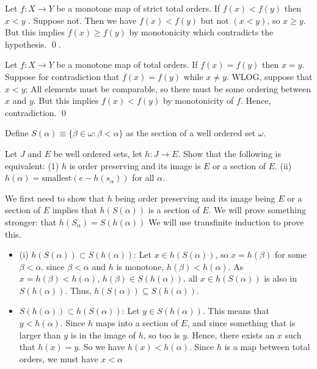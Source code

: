 \documentclass{article}
\begin{document}
 Let $f: X \rightarrow Y$ be a monotone map of strict total orders. If $f(x) < f(y)$ then $x < y$
. Suppose not. Then we have $f(x) < f(y)$ but not $(x < y)$, so $x \geq y$. But this implies  $f(x) \geq f(y)$
by monotonicity which contradicts the hypothesis. \qed.

 Let $f: X \rightarrow Y$ be a monotone map of total orders. If $f(x) = f(y)$ then $x = y$.
 Suppose for contradiction that $f(x) = f(y)$ while $x \neq y$.
WLOG, suppose that $x < y$; All elements must be comparable, so there must be some ordering between $x$ and $y$.
But this implies $f(x) < f(y)$ by monotonicity of $f$. Hence, contradiction. \qed

Define $S(\alpha) \equiv \{ \beta \in \omega : \beta < \alpha \}$ as the section of a well ordered set $\omega$.

 Let $J$ and $E$ be well ordered sets, let $h: J \rightarrow E$. Show that the following is equivalent: (1) $h$ is order preserving and its image is $E$ or
a section of $E$. (ii) $h(\alpha) = \text{smallest}(e - h(s_\alpha))$ for all $\alpha$.

We first need to show that $h$ being order preserving and its image being $E$ or a section of $E$ implies that 
$h(S(\alpha))$ is a section of $E$. We will prove something stronger:
that $h(S_\alpha) = S(h(\alpha))$ We will use transfinite induction to prove this.
\begin{itemize}
    \item (i) $h(S(\alpha)) \subset S(h(\alpha))$: Let $x \in h(S(\alpha))$, so $x = h(\beta)$ for some $\beta < \alpha$.
        since $\beta < \alpha$ and $h$ is monotone, $h(\beta) < h(\alpha)$. As $x = h(\beta) < h(\alpha)$, $h(\beta) \in S(h(\alpha))$.
        all $x \in h(S(\alpha))$ is also in $S(h(\alpha))$. Thus, $h(S(\alpha)) \subseteq S(h(\alpha))$.
    \item $S(h(\alpha)) \subset h(S(\alpha))$: Let $y \in S(h(\alpha))$. This means that $y < h(\alpha)$. Since $h$ maps into a section of $E$,
        and since something that is larger than $y$ is in the image of $h$, so too is $y$. Hence, there exists an $x$ such that $h(x) = y$.
        So we have $h(x) < h(\alpha)$. Since $h$ is a map between total orders, we must have $x < \alpha$

\end{itemize}
\end{document}
